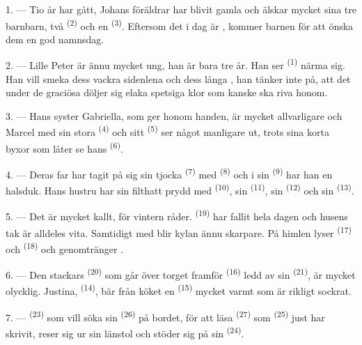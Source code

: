 \VUsaut{3.0mm}

1. --- Tio år har gått, Johans föräldrar har blivit gamla och älskar mycket sina tre barnbarn,
två  \textsuperscript{(2)} och en
 \textsuperscript{(3)}. Eftersom det i dag är
, kommer barnen för att önska dem en god namnsdag.

2. --- Lille Peter är ännu mycket ung, han är bara tre år. Han ser
 \textsuperscript{(1)} närma sig. Han vill smeka dess vackra
sidenlena  och dess långa , han tänker inte på, att det under de
graciösa  döljer sig elaka spetsiga klor som kanske ska riva honom.

3. --- Hans syster Gabriella, som ger honom handen, är mycket allvarligare och Marcel med sin
stora  \textsuperscript{(4)} och sitt  \textsuperscript{(5)}
ser något manligare ut, trots sina korta byxor som låter se hans 
\textsuperscript{(6)}.

4. --- Deras far har tagit på sig sin tjocka  \textsuperscript{(7)} med
 \textsuperscript{(8)} och i sin
 \textsuperscript{(9)} har han en halsduk. Hans hustru har sin
filthatt prydd med  \textsuperscript{(10)}, sin 
\textsuperscript{(11)}, sin  \textsuperscript{(12)} och sin
 \textsuperscript{(13)}.

5. --- Det är mycket kallt, för vintern råder.  \textsuperscript{(19)} har fallit
hela dagen och husens tak är alldeles vita. Samtidigt med  blir kylan ännu
skarpare. På himlen lyser
 \textsuperscript{(17)} och 
\textsuperscript{(18)} och genomtränger .

\VUsaut{4.2mm}
\VUsaut{3.0mm}

6. --- Den stackars  \textsuperscript{(20)} som går över torget framför
 \textsuperscript{(16)} ledd av sin  \textsuperscript{(21)}, är
mycket olycklig. Justina,  \textsuperscript{(14)}, bär från köket en
 \textsuperscript{(15)} mycket varmt  som är rikligt sockrat.

7. ---  \textsuperscript{(23)} som vill söka sin
 \textsuperscript{(26)} på bordet, för att läsa 
\textsuperscript{(27)} som  \textsuperscript{(25)} just har skrivit, reser sig
ur sin länstol och stöder sig på sin  \textsuperscript{(24)}.


